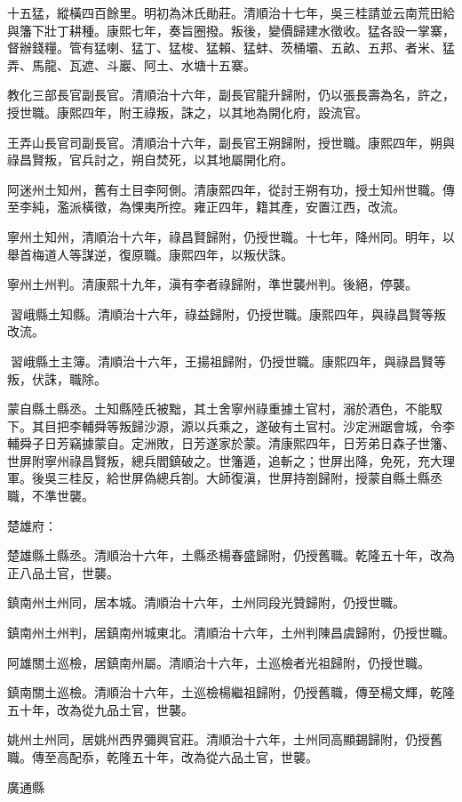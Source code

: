 \begin{pinyinscope}
十五猛，縱橫四百餘里。明初為沐氏勛莊。清順治十七年，吳三桂請並云南荒田給與籓下壯丁耕種。康熙七年，奏旨圈撥。叛後，變價歸建水徵收。猛各設一掌寨，督辦錢糧。管有猛喇、猛丁、猛梭、猛賴、猛蚌、茨桶壩、五畝、五邦、者米、猛弄、馬龍、瓦遮、斗巖、阿土、水塘十五寨。

教化三部長官副長官。清順治十六年，副長官龍升歸附，仍以張長壽為名，許之，授世職。康熙四年，附王祿叛，誅之，以其地為開化府，設流官。

王弄山長官司副長官。清順治十六年，副長官王朔歸附，授世職。康熙四年，朔與祿昌賢叛，官兵討之，朔自焚死，以其地屬開化府。

阿迷州土知州，舊有土目李阿側。清康熙四年，從討王朔有功，授土知州世職。傳至李純，濫派橫徵，為惈夷所控。雍正四年，籍其產，安置江西，改流。

寧州土知州，清順治十六年，祿昌賢歸附，仍授世職。十七年，降州同。明年，以舉首梅道人等謀逆，復原職。康熙四年，以叛伏誅。

寧州土州判。清康熙十九年，滇有李者祿歸附，準世襲州判。後絕，停襲。

習峨縣土知縣。清順治十六年，祿益歸附，仍授世職。康熙四年，與祿昌賢等叛改流。

習峨縣土主簿。清順治十六年，王揚祖歸附，仍授世職。康熙四年，與祿昌賢等叛，伏誅，職除。

蒙自縣土縣丞。土知縣陸氏被黜，其土舍寧州祿重據土官村，溺於酒色，不能馭下。其目把李輔舜等叛歸沙源，源以兵乘之，遂破有土官村。沙定洲踞會城，令李輔舜子日芳竊據蒙自。定洲敗，日芳遂家於蒙。清康熙四年，日芳弟日森子世籓、世屏附寧州祿昌賢叛，總兵閻鎮破之。世籓遁，追斬之；世屏出降，免死，充大理軍。後吳三桂反，給世屏偽總兵劄。大師復滇，世屏持劄歸附，授蒙自縣土縣丞職，不準世襲。

楚雄府：

楚雄縣土縣丞。清順治十六年，土縣丞楊春盛歸附，仍授舊職。乾隆五十年，改為正八品土官，世襲。

鎮南州土州同，居本城。清順治十六年，土州同段光贊歸附，仍授世職。

鎮南州土州判，居鎮南州城東北。清順治十六年，土州判陳昌虞歸附，仍授世職。

阿雄關土巡檢，居鎮南州屬。清順治十六年，土巡檢者光祖歸附，仍授世職。

鎮南關土巡檢。清順治十六年，土巡檢楊繼祖歸附，仍授舊職，傳至楊文輝，乾隆五十年，改為從九品土官，世襲。

姚州土州同，居姚州西界彌興官莊。清順治十六年，土州同高顯錫歸附，仍授舊職。傳至高配忝，乾隆五十年，改為從六品土官，世襲。

廣通縣


\end{pinyinscope}
